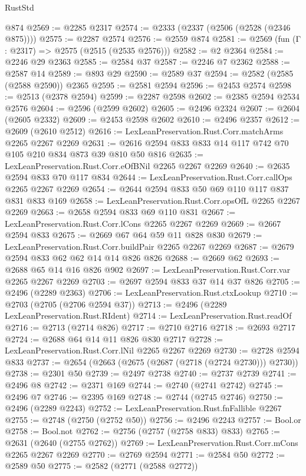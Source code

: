 \begin{lexlean}{RustStd}
\begin{coremodule}
    @874
@2569 := @2285 @2317
@2574 := @2333 (@2337 (@2506 (@2528 (@2346 @875))))
@2575 := @2287 @2574
@2576 := @2559 @874
@2581 := @2569 (fun (Γ : @2317) => @2575 (@2515 (@2535 @2576)))
@2582 := @2 @2364
@2584 := @2246 @29 @2363
@2585 := @2584 @37
@2587 := @2246 @7 @2362
@2588 := @2587 @14
@2589 := @893 @29
@2590 := @2589 @37
@2594 := @2582 (@2585 (@2588 @2590)) @2365
@2595 := @2581 @2594
@2596 := @2453 @2574
@2598 := @2513 (@2378 @2594)
@2599 := @2287 @2598
@2602 := @2385 @2594 @2534 @2576
@2604 := @2596 (@2599 @2602)
@2605 := @2496 @2324
@2607 := @2604 (@2605 @2332)
@2609 := @2453 @2598 @2602
@2610 := @2496 @2357
@2612 := @2609 (@2610 @2512)
@2616 := LexLeanPreservation.Rust.Corr.matchArms @2265 @2267 @2269
@2631 := @2616 @2594 @833 @833 @14 @117 @742 @70 @105 @210 @834 @873 @39 @810 @50 @816
@2635 := LexLeanPreservation.Rust.Corr.eOfBNil @2265 @2267 @2269
@2640 := @2635 @2594 @833 @70 @117 @834
@2644 := LexLeanPreservation.Rust.Corr.callOps @2265 @2267 @2269
@2654 := @2644 @2594 @833 @50 @69 @110 @117 @837 @831 @833 @169
@2658 := LexLeanPreservation.Rust.Corr.opsOfL @2265 @2267 @2269
@2663 := @2658 @2594 @833 @69 @110 @831
@2667 := LexLeanPreservation.Rust.Corr.lCons @2265 @2267 @2269
@2669 := @2667 @2594 @833
@2675 := @2669 @67 @64 @59 @11 @828 @830
@2679 := LexLeanPreservation.Rust.Corr.buildPair @2265 @2267 @2269
@2687 := @2679 @2594 @833 @62 @62 @14 @14 @826 @826
@2688 := @2669 @62
@2693 := @2688 @65 @14 @16 @826 @902
@2697 := LexLeanPreservation.Rust.Corr.var @2265 @2267 @2269
@2703 := @2697 @2594 @833 @37 @14 @37 @826
@2705 := @2496 (@2289 @2363)
@2706 := LexLeanPreservation.Rust.ctxLookup
@2710 := @2703 (@2705 (@2706 @2594 @37))
@2713 := @2496 (@2289 LexLeanPreservation.Rust.RIdent)
@2714 := LexLeanPreservation.Rust.readOf
@2716 := @2713 (@2714 @826)
@2717 := @2710 @2716
@2718 := @2693 @2717
@2724 := @2688 @64 @14 @11 @826 @830 @2717
@2728 := LexLeanPreservation.Rust.Corr.lNil @2265 @2267 @2269
@2730 := @2728 @2594 @833
@2737 := @2654 (@2663 (@2675 (@2687 (@2718 (@2724 @2730))) @2730))
@2738 := @2301 @50
@2739 := @2497 @2738
@2740 := @2737 @2739
@2741 := @2496 @8
@2742 := @2371 @169
@2744 := @2740 (@2741 @2742)
@2745 := @2496 @7
@2746 := @2395 @169
@2748 := @2744 (@2745 @2746)
@2750 := @2496 (@2289 @2243)
@2752 := LexLeanPreservation.Rust.fnFallible @2267
@2755 := @2748 (@2750 (@2752 @50))
@2756 := @2496 @2243
@2757 := Bool.or
@2758 := Bool.not
@2762 := @2756 (@2757 (@2758 @833) @833)
@2765 := @2631 (@2640 (@2755 @2762))
@2769 := LexLeanPreservation.Rust.Corr.mCons @2265 @2267 @2269
@2770 := @2769 @2594
@2771 := @2584 @50
@2772 := @2589 @50
@2775 := @2582 (@2771 (@2588 @2772))

\end{coremodule}
\end{lexlean}

